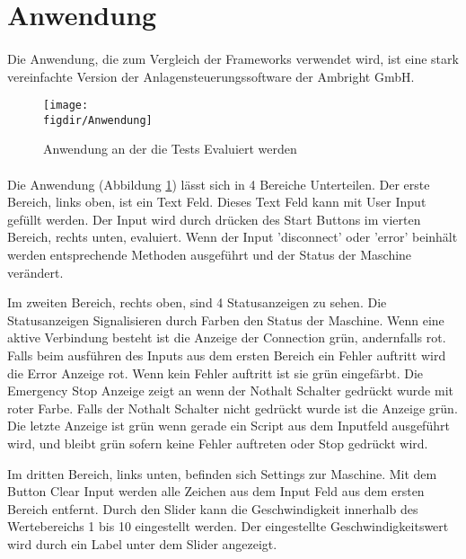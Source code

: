 		\newpage
	\section{Anwendung}
		\paragraph{} Die Anwendung, die zum Vergleich der Frameworks verwendet wird, ist eine stark vereinfachte Version der Anlagensteuerungssoftware der Ambright GmbH.  
		
		\FloatBarrier
		\begin{figure}[t]		
			\centering
			\texttt{[image: \\figdir/Anwendung]}
				
			\caption[Anwendung]
			{Anwendung an der die Tests Evaluiert werden}
			\label{FIG:Anwendung}
		\end{figure}
		\FloatBarrier
		
		\paragraph{} Die Anwendung (Abbildung \ref{FIG:Anwendung}) lässt sich in 4 Bereiche Unterteilen. Der erste Bereich, links oben, ist ein Text Feld. Dieses Text Feld kann mit User Input gefüllt werden. Der Input wird durch drücken des Start Buttons im vierten Bereich, rechts unten, evaluiert. Wenn der Input 'disconnect' oder 'error' beinhält werden entsprechende Methoden ausgeführt und der Status der Maschine verändert.  
		
		Im zweiten Bereich, rechts oben, sind 4 Statusanzeigen zu sehen. Die Statusanzeigen Signalisieren durch Farben den Status der Maschine. Wenn eine aktive Verbindung besteht ist die Anzeige der Connection grün, andernfalls rot. 
		Falls beim ausführen des Inputs aus dem ersten Bereich ein Fehler auftritt wird die Error Anzeige rot. Wenn kein Fehler auftritt ist sie grün eingefärbt. 
		Die Emergency Stop Anzeige zeigt an wenn der Nothalt Schalter gedrückt wurde mit roter Farbe. Falls der Nothalt Schalter nicht gedrückt wurde ist die Anzeige grün. 
		Die letzte Anzeige ist grün wenn gerade ein Script aus dem Inputfeld ausgeführt wird, und bleibt grün sofern keine Fehler auftreten oder Stop gedrückt wird.
		
		Im dritten Bereich, links unten, befinden sich Settings zur Maschine. Mit dem Button Clear Input werden alle Zeichen aus dem  Input Feld aus dem ersten Bereich entfernt. Durch den Slider kann die Geschwindigkeit innerhalb des Wertebereichs 1 bis 10 eingestellt werden. Der eingestellte Geschwindigkeitswert wird durch ein Label unter dem Slider angezeigt.
		
